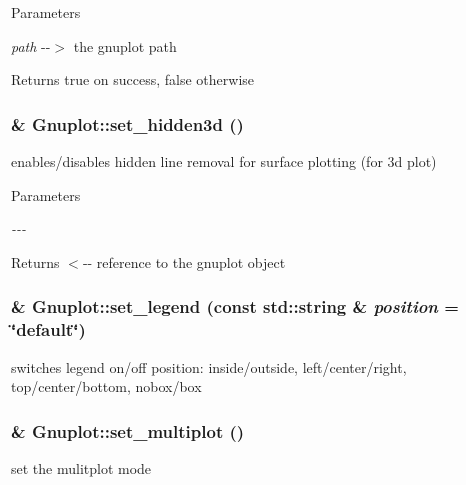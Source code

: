 \begin{DoxyParams}{Parameters}
\item[{\em path}]-\/-\/$>$ the gnuplot path\end{DoxyParams}
\begin{DoxyReturn}{Returns}
true on success, false otherwise 
\end{DoxyReturn}
\hypertarget{class_gnuplot_a891f9800705eddc3f73886f265c009b8}{
\subsubsection[{set\_\-hidden3d}]{\& Gnuplot::set\_\-hidden3d ()}}
\label{class_gnuplot_a891f9800705eddc3f73886f265c009b8}
enables/disables hidden line removal for surface plotting (for 3d plot)


\begin{DoxyParams}{Parameters}
\item[{\em -\/-\/-\/}]\end{DoxyParams}
\begin{DoxyReturn}{Returns}
$<$-\/-\/ reference to the gnuplot object 
\end{DoxyReturn}
\hypertarget{class_gnuplot_ad64a717dac18167f656c4f09239973f8}{
\subsubsection[{set\_\-legend}]{ \& Gnuplot::set\_\-legend (const std::string \& {\em position} = {\ttfamily \char`\"{}default\char`\"{}})}}
\label{class_gnuplot_ad64a717dac18167f656c4f09239973f8}
switches legend on/off position: inside/outside, left/center/right, top/center/bottom, nobox/box \hypertarget{class_gnuplot_a67efc4d4dc46b6100d14ba2f7366ef11}{
\subsubsection[{set\_\-multiplot}]{\& Gnuplot::set\_\-multiplot ()}}
\label{class_gnuplot_a67efc4d4dc46b6100d14ba2f7366ef11}
set the mulitplot mode



